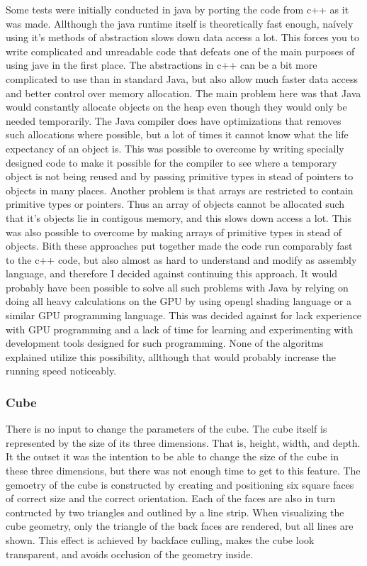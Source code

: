 \documentclass[a4paper,12pt]{article}
\begin{document}
Some tests were initially conducted in java by porting the code from c++ as it was made. Allthough the java runtime itself is theoretically fast enough, naívely using it's methods of abstraction slows down data access a lot. This forces you to write complicated and unreadable code that defeats one of the main purposes of using jave in the first place. The abstractions in c++ can be a bit more complicated to use than in standard Java, but also allow much faster data access and better control over memory allocation. The main problem here was that Java would constantly allocate objects on the heap even though they would only be needed temporarily. The Java compiler does have optimizations that removes such allocations where possible, but a lot of times it cannot know what the life expectancy of an object is. This was possible to overcome by writing specially designed code to make it possible for the compiler to see where a temporary object is not being reused and by passing primitive types in stead of pointers 
to objects in many places. Another problem is that arrays are restricted to contain primitive types or pointers. Thus an array of objects cannot be allocated such that it's objects lie in contigous memory, and this slows down access a lot. This was also possible to overcome by making arrays of primitive types in stead of objects. Bith these approaches put together made the code run comparably fast to the c++ code, but also almost as hard to understand and modify as assembly language, and therefore I decided against continuing this approach. It would probably have been possible to solve all such problems with Java by relying on doing all heavy calculations on the GPU by using opengl shading language or a similar GPU programming language. This was decided against for lack experience with GPU programming and a lack of time for learning and experimenting with development tools designed for such programming. None of the algoritms explained utilize this possibility, allthough that would probably increase the 
running speed noticeably.

\subsubsection{Cube}
There is no input to change the parameters of the cube. The cube itself is represented by the size of its three dimensions. That is, height, width, and depth. It the outset it was the intention to be able to change the size of the cube in these three dimensions, but there was not enough time to get to this feature. The gemoetry of the cube is constructed by creating and positioning six square faces of correct size and the correct orientation. Each of the faces are also in turn contructed by two triangles and outlined by a line strip. When visualizing the cube geometry, only the triangle of the back faces are rendered, but all lines are shown. This effect is achieved by backface culling, makes the cube look transparent, and avoids occlusion of the geometry inside.
\end{document}
